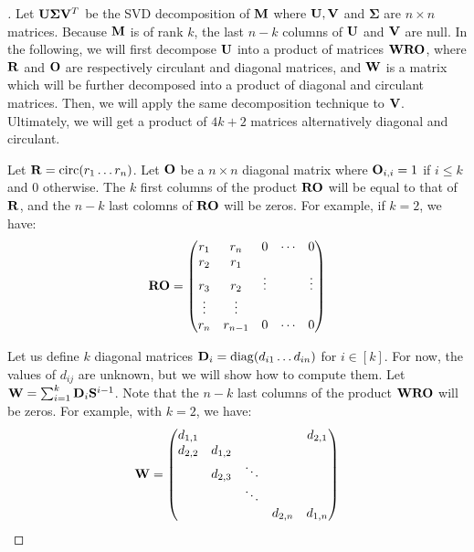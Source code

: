 \begin{proof}[]
Let $\mathbf{U} \mathbf{\Sigma} \mathbf{V}^{T}$ be the SVD decomposition of $\mathbf{M}$ where $\mathbf{U},\mathbf{V}$ and $\mathbf{\Sigma}$ are $n \times n$ matrices.
Because $\mathbf{M}$ is of rank $k$, the last $n-k$ columns of $\mathbf{U}$ and $\mathbf{V}$ are null.
In the following, we will first decompose $\mathbf{U}$ into a product of matrices $\mathbf{W}\mathbf{R}\mathbf{O}$, where $\mathbf{R}$ and $\mathbf{O}$ are respectively circulant and diagonal matrices, and $\mathbf{W}$ is a matrix which will be further decomposed into a product of diagonal and circulant matrices.
Then, we will apply the same decomposition technique to $\mathbf{V}$.
Ultimately, we will get a product of $4k+2$ matrices alternatively diagonal and circulant.  

Let $\mathbf{R} = \mathrm{circ}(r_{1}\ldots r_{n})$. Let $\mathbf{O}$ be a $n \times n$ diagonal matrix where $\mathbf{O}_{i,i} = 1$ if $i \le k$ and $0$ otherwise. The $k$ first columns of the product $\mathbf{R}\mathbf{O}$ will be equal to that of $\mathbf{R}$, and the $n-k$ last colomns of $\mathbf{R}\mathbf{O}$ will be zeros. For example, if $k=2$, we have: 
\begin{equation}
  \mathbf{R}\mathbf{O} = \begin{pmatrix}
  r_{1} & r_{n} & 0 & \cdots & 0\\
  r_{2} & r_{1}\\
  r_{3} & r_{2} & \vdots &  & \vdots\\
  \vdots & \vdots\\
  r_{n} & r_{n-1} & 0 & \cdots & 0
  \end{pmatrix}
\end{equation}

Let us define $k$ diagonal matrices $\mathbf{D}_{i} = \mathrm{diag}(d_{i1} \ldots d_{in})$ for $i \in [k]$.
For now, the values of $d_{ij}$ are unknown, but we will show how to compute them.
Let $\mathbf{W} = \sum_{i=1}^{k} \mathbf{D}_{i} \mathbf{S}^{i-1}$.
Note that the $n-k$ last columns of the product $\mathbf{W}\mathbf{R}\mathbf{O}$ will be zeros.
For example, with $k=2$, we have: 
\begin{equation}
  \mathbf{W} = \begin{pmatrix}
  d_{1,1} &  &  &  & d_{2,1} \\
  d_{2,2} & d_{1,2} \\
   & d_{2,3} & \ddots \\
   &  & \ddots \\
   &  &  & d_{2,n} & d_{1,n}
  \end{pmatrix}
\end{equation}


\end{proof}
